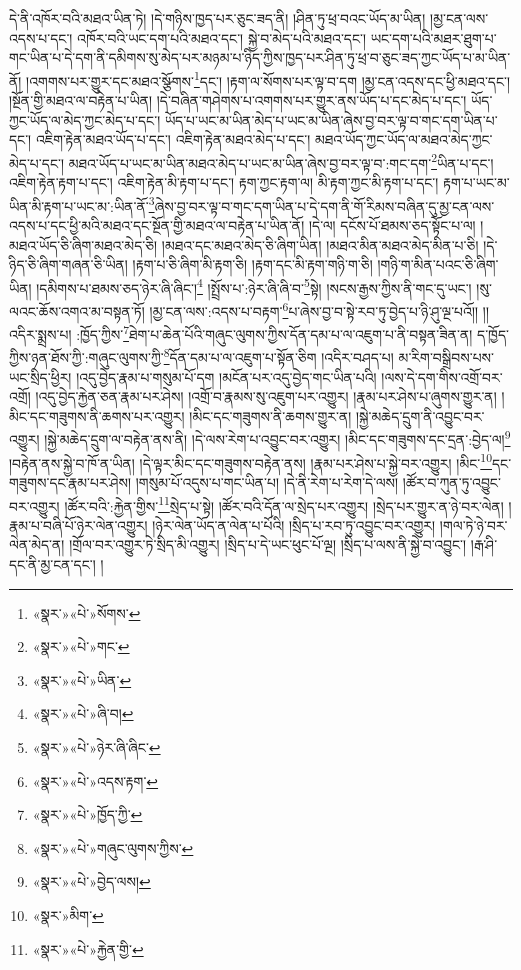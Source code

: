 དེ་ནི་འཁོར་བའི་མཐའ་ཡིན་ཏེ། །དེ་གཉིས་ཁྱད་པར་ཅུང་ཟད་ནི། །ཤིན་ཏུ་ཕྲ་བའང་ཡོད་མ་ཡིན། །མྱ་ངན་ལས་འདས་པ་དང་། འཁོར་བའི་ཡང་དག་པའི་མཐའ་དང་། སྐྱེ་བ་མེད་པའི་མཐའ་དང་། ཡང་དག་པའི་མཐར་ཐུག་པ་གང་ཡིན་པ་དེ་དག་ནི་དམིགས་སུ་མེད་པར་མཉམ་པ་ཉིད་ཀྱིས་ཁྱད་པར་ཤིན་ཏུ་ཕྲ་བ་ཅུང་ཟད་ཀྱང་ཡོད་པ་མ་ཡིན་ནོ། །འགགས་པར་གྱུར་དང་མཐའ་སྩོགས་\footnote{«སྣར་»«པེ་»སོགས་}དང་། །རྟག་ལ་སོགས་པར་ལྟ་བ་དག །མྱ་ངན་འདས་དང་ཕྱི་མཐའ་དང་། །སྔོན་གྱི་མཐའ་ལ་བརྟེན་པ་ཡིན། །དེ་བཞིན་གཤེགས་པ་འགགས་པར་གྱུར་ནས་ཡོད་པ་དང་མེད་པ་དང་། ཡོད་ཀྱང་ཡོད་ལ་མེད་ཀྱང་མེད་པ་དང་། ཡོད་པ་ཡང་མ་ཡིན་མེད་པ་ཡང་མ་ཡིན་ཞེས་བྱ་བར་ལྟ་བ་གང་དག་ཡིན་པ་དང་། འཇིག་རྟེན་མཐའ་ཡོད་པ་དང་། འཇིག་རྟེན་མཐའ་མེད་པ་དང་། མཐའ་ཡོད་ཀྱང་ཡོད་ལ་མཐའ་མེད་ཀྱང་མེད་པ་དང་། མཐའ་ཡོད་པ་ཡང་མ་ཡིན་མཐའ་མེད་པ་ཡང་མ་ཡིན་ཞེས་བྱ་བར་ལྟ་བ་:གང་དག་\footnote{«སྣར་»«པེ་»གང་}ཡིན་པ་དང་། འཇིག་རྟེན་རྟག་པ་དང་། འཇིག་རྟེན་མི་རྟག་པ་དང་། རྟག་ཀྱང་རྟག་ལ། མི་རྟག་ཀྱང་མི་རྟག་པ་དང་། རྟག་པ་ཡང་མ་ཡིན་མི་རྟག་པ་ཡང་མ་:ཡིན་ནོ་\footnote{«སྣར་»«པེ་»ཡིན་}ཞེས་བྱ་བར་ལྟ་བ་གང་དག་ཡིན་པ་དེ་དག་ནི་གོ་རིམས་བཞིན་དུ་མྱ་ངན་ལས་འདས་པ་དང་ཕྱི་མའི་མཐའ་དང་སྔོན་གྱི་མཐའ་ལ་བརྟེན་པ་ཡིན་ནོ། །དེ་ལ། དངོས་པོ་ཐམས་ཅད་སྟོང་པ་ལ། །མཐའ་ཡོད་ཅི་ཞིག་མཐའ་མེད་ཅི། །མཐའ་དང་མཐའ་མེད་ཅི་ཞིག་ཡིན། །མཐའ་མིན་མཐའ་མེད་མིན་པ་ཅི། །དེ་ཉིད་ཅི་ཞིག་གཞན་ཅི་ཡིན། །རྟག་པ་ཅི་ཞིག་མི་རྟག་ཅི། །རྟག་དང་མི་རྟག་གཉི་ག་ཅི། །གཉི་ག་མིན་པའང་ཅི་ཞིག་ཡིན། །དམིགས་པ་ཐམས་ཅད་ཉེར་ཞི་ཞིང་།\footnote{«སྣར་»«པེ་»ཞི་བ།} །སྤྲོས་པ་:ཉེར་ཞི་ཞི་བ་\footnote{«སྣར་»«པེ་»ཉེར་ཞི་ཞིང་}སྟེ། །སངས་རྒྱས་ཀྱིས་ནི་གང་དུ་ཡང་། །སུ་ལའང་ཆོས་འགའ་མ་བསྟན་ཏོ། །མྱ་ངན་ལས་:འདས་པ་བརྟག་\footnote{«སྣར་»«པེ་»འདས་རྟག་}པ་ཞེས་བྱ་བ་སྟེ་རབ་ཏུ་བྱེད་པ་ཉི་ཤུ་ལྔ་པའོ།། །།འདིར་སྨྲས་པ། :ཁྱོད་ཀྱིས་\footnote{«སྣར་»«པེ་»ཁྱོད་ཀྱི་}ཐེག་པ་ཆེན་པོའི་གཞུང་ལུགས་ཀྱིས་དོན་དམ་པ་ལ་འཇུག་པ་ནི་བསྟན་ཟིན་ན། ད་ཁྱོད་ཀྱིས་ཉན་ཐོས་ཀྱི་:གཞུང་ལུགས་ཀྱི་\footnote{«སྣར་»«པེ་»གཞུང་ལུགས་ཀྱིས་}དོན་དམ་པ་ལ་འཇུག་པ་སྟོན་ཅིག །འདིར་བཤད་པ། མ་རིག་བསྒྲིབས་པས་ཡང་སྲིད་ཕྱིར། །འདུ་བྱེད་རྣམ་པ་གསུམ་པོ་དག །མངོན་པར་འདུ་བྱེད་གང་ཡིན་པའི། །ལས་དེ་དག་གིས་འགྲོ་བར་འགྲོ། །འདུ་བྱེད་རྐྱེན་ཅན་རྣམ་པར་ཤེས། །འགྲོ་བ་རྣམས་སུ་འཇུག་པར་འགྱུར། །རྣམ་པར་ཤེས་པ་ཞུགས་གྱུར་ན། །མིང་དང་གཟུགས་ནི་ཆགས་པར་འགྱུར། །མིང་དང་གཟུགས་ནི་ཆགས་གྱུར་ན། །སྐྱེ་མཆེད་དྲུག་ནི་འབྱུང་བར་འགྱུར། །སྐྱེ་མཆེད་དྲུག་ལ་བརྟེན་ནས་ནི། །དེ་ལས་རེག་པ་འབྱུང་བར་འགྱུར། །མིང་དང་གཟུགས་དང་དྲན་:བྱེད་ལ།\footnote{«སྣར་»«པེ་»བྱེད་ལས།} །བརྟེན་ནས་སྐྱེ་བ་ཁོ་ན་ཡིན། །དེ་ལྟར་མིང་དང་གཟུགས་བརྟེན་ནས། །རྣམ་པར་ཤེས་པ་སྐྱེ་བར་འགྱུར། །མིང་\footnote{«སྣར་»མིག་}དང་གཟུགས་དང་རྣམ་པར་ཤེས། །གསུམ་པོ་འདུས་པ་གང་ཡིན་པ། །དེ་ནི་རེག་པ་རེག་དེ་ལས། །ཚོར་བ་ཀུན་ཏུ་འབྱུང་བར་འགྱུར། །ཚོར་བའི་:རྐྱེན་གྱིས་\footnote{«སྣར་»«པེ་»རྐྱེན་གྱི་}སྲེད་པ་སྟེ། །ཚོར་བའི་དོན་ལ་སྲེད་པར་འགྱུར། །སྲེད་པར་གྱུར་ན་ཉེ་བར་ལེན། །རྣམ་པ་བཞི་པོ་ཉེར་ལེན་འགྱུར། །ཉེར་ལེན་ཡོད་ན་ལེན་པ་པོའི། །སྲིད་པ་རབ་ཏུ་འབྱུང་བར་འགྱུར། །གལ་ཏེ་ཉེ་བར་ལེན་མེད་ན། །གྲོལ་བར་འགྱུར་ཏེ་སྲིད་མི་འགྱུར། །སྲིད་པ་དེ་ཡང་ཕུང་པོ་ལྔ། །སྲིད་པ་ལས་ནི་སྐྱེ་བ་འབྱུང་། །རྒ་ཤི་དང་ནི་མྱ་ངན་དང་། །
